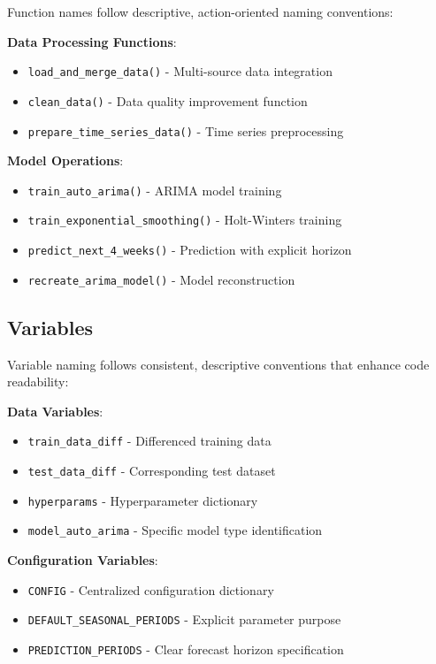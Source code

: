 Function names follow descriptive, action-oriented naming conventions:

\textbf{Data Processing Functions}:
\begin{itemize}
	\item \texttt{load\_and\_merge\_data()} - Multi-source data integration
	\item \texttt{clean\_data()} - Data quality improvement function
	\item \texttt{prepare\_time\_series\_data()} - Time series preprocessing
\end{itemize}

\textbf{Model Operations}:
\begin{itemize}
	\item \texttt{train\_auto\_arima()} - ARIMA model training
	\item \texttt{train\_exponential\_smoothing()} - Holt-Winters training
	\item \texttt{predict\_next\_4\_weeks()} - Prediction with explicit horizon
	\item \texttt{recreate\_arima\_model()} - Model reconstruction
\end{itemize}

\subsection{Variables}

Variable naming follows consistent, descriptive conventions that enhance code readability:

\textbf{Data Variables}:
\begin{itemize}
	\item \texttt{train\_data\_diff} - Differenced training data
	\item \texttt{test\_data\_diff} - Corresponding test dataset
	\item \texttt{hyperparams} - Hyperparameter dictionary
	\item \texttt{model\_auto\_arima} - Specific model type identification
\end{itemize}

\textbf{Configuration Variables}:
\begin{itemize}
	\item \texttt{CONFIG} - Centralized configuration dictionary
	\item \texttt{DEFAULT\_SEASONAL\_PERIODS} - Explicit parameter purpose
	\item \texttt{PREDICTION\_PERIODS} - Clear forecast horizon specification
\end{itemize}

